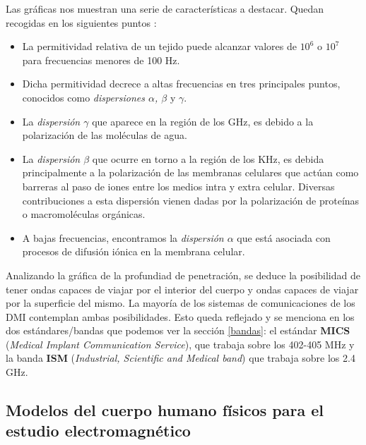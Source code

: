 Las gráficas nos muestran una serie de características a destacar. Quedan recogidas en los siguientes puntos \cite{gabriel}:

\begin{itemize}
    \item La permitividad relativa de un tejido puede alcanzar valores de $10^{6}$ o $10^{7}$ para frecuencias menores de 100 Hz.
    \item Dicha permitividad decrece a altas frecuencias en tres principales puntos, conocidos como \textit{dispersiones $\alpha$, $\beta$} y \textit{$\gamma$}.
    \item La \textit{dispersión $\gamma$} que aparece en la región de los GHz, es debido a la polarización de las moléculas de agua.
    \item La \textit{dispersión $\beta$} que ocurre en torno a la región de los KHz, es debida principalmente a la polarización de las membranas celulares que actúan como barreras al paso de iones entre los medios intra y extra celular. Diversas contribuciones a esta dispersión vienen dadas por la polarización de proteínas o macromoléculas orgánicas.
    \item A bajas frecuencias, encontramos la \textit{dispersión $\alpha$} que está asociada con procesos de difusión iónica en la membrana celular.

\end{itemize}

Analizando la gráfica de la profundiad de penetración, se deduce la posibilidad de tener ondas capaces de viajar por el interior del cuerpo y ondas capaces de viajar por la superficie del mismo. La mayoría de los sistemas de comunicaciones de los DMI contemplan ambas posibilidades. Esto queda reflejado y se menciona en los dos estándares/bandas que podemos ver la sección \ref{bandas}: el estándar \textbf{MICS} (\textit{Medical Implant Communication Service}), que trabaja sobre los 402-405 MHz y la banda \textbf{ISM} (\textit{Industrial, Scientific and Medical band}) que trabaja sobre los 2.4 GHz.

\subsection{Modelos del cuerpo humano físicos para el estudio electromagnético}\label{subsec:modelos-del-cuerpo-humano-fisicos-para-el-estudio-electromagnetico}

